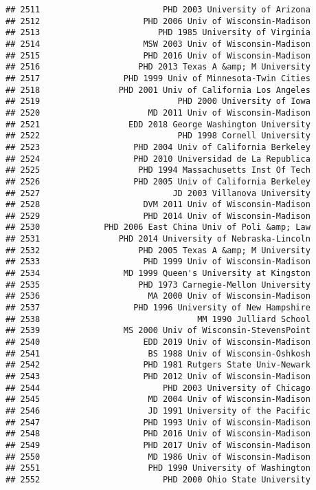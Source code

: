\documentclass[
]{article}
\begin{document}
\begin{verbatim}
## 2511                         PHD 2003 University of Arizona
## 2512                     PHD 2006 Univ of Wisconsin-Madison
## 2513                        PHD 1985 University of Virginia
## 2514                     MSW 2003 Univ of Wisconsin-Madison
## 2515                     PHD 2016 Univ of Wisconsin-Madison
## 2516                    PHD 2013 Texas A &amp; M University
## 2517                 PHD 1999 Univ of Minnesota-Twin Cities
## 2518                PHD 2001 Univ of California Los Angeles
## 2519                            PHD 2000 University of Iowa
## 2520                      MD 2011 Univ of Wisconsin-Madison
## 2521                  EDD 2018 George Washington University
## 2522                            PHD 1998 Cornell University
## 2523                   PHD 2004 Univ of California Berkeley
## 2524                   PHD 2010 Universidad de La Republica
## 2525                    PHD 1994 Massachusetts Inst Of Tech
## 2526                   PHD 2005 Univ of California Berkeley
## 2527                           JD 2003 Villanova University
## 2528                     DVM 2011 Univ of Wisconsin-Madison
## 2529                     PHD 2014 Univ of Wisconsin-Madison
## 2530             PHD 2006 East China Univ of Poli &amp; Law
## 2531                PHD 2014 University of Nebraska-Lincoln
## 2532                    PHD 2005 Texas A &amp; M University
## 2533                     PHD 1999 Univ of Wisconsin-Madison
## 2534                 MD 1999 Queen's University at Kingston
## 2535                    PHD 1973 Carnegie-Mellon University
## 2536                      MA 2000 Univ of Wisconsin-Madison
## 2537                   PHD 1996 University of New Hampshire
## 2538                                MM 1990 Julliard School
## 2539                 MS 2000 Univ of Wisconsin-StevensPoint
## 2540                     EDD 2019 Univ of Wisconsin-Madison
## 2541                      BS 1988 Univ of Wisconsin-Oshkosh
## 2542                     PHD 1981 Rutgers State Univ-Newark
## 2543                     PHD 2012 Univ of Wisconsin-Madison
## 2544                         PHD 2003 University of Chicago
## 2545                      MD 2004 Univ of Wisconsin-Madison
## 2546                      JD 1991 University of the Pacific
## 2547                     PHD 1993 Univ of Wisconsin-Madison
## 2548                     PHD 2016 Univ of Wisconsin-Madison
## 2549                     PHD 2017 Univ of Wisconsin-Madison
## 2550                      MD 1986 Univ of Wisconsin-Madison
## 2551                      PHD 1990 University of Washington
## 2552                         PHD 2000 Ohio State University

\end{verbatim}
\end{document}
